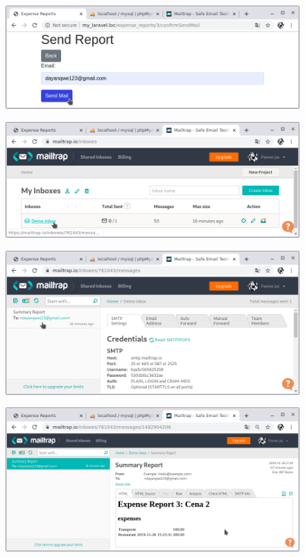 \documentclass{article}
\begin{document}
\newpage

\begin{figure}[h!]
  \centering
  \includegraphics[scale=0.5]{./Pictures/131_send_mail.png}
\end{figure}

\begin{figure}[h!]
  \centering
  \includegraphics[scale=0.5]{./Pictures/132_send_mail.png}
\end{figure}

\begin{figure}[h!]
  \centering
  \includegraphics[scale=0.5]{./Pictures/133_send_mail.png}
\end{figure}

\begin{figure}[h!]
  \centering
  \includegraphics[scale=0.5]{./Pictures/134_send_mail_ok.png}
\end{figure}
\end{document}
